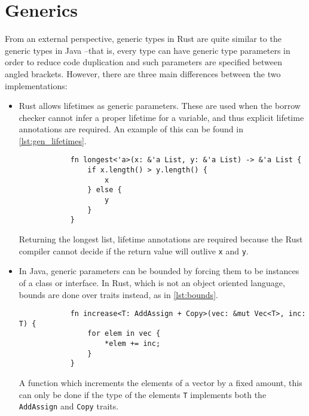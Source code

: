 \section{Generics}

From an external perspective, generic types in Rust are quite similar to the
generic types in Java --that is, every type can have generic type parameters in
order to reduce code duplication and such parameters are specified between
angled brackets. However, there are three main differences between the two
implementations:

\begin{itemize}
    \item Rust allows lifetimes as generic parameters. These are used when the
        borrow checker cannot infer a proper lifetime for a variable, and thus
        explicit lifetime annotations are required. An example of this can be
        found in \ref{lst:gen_lifetimes}.
  
        \begin{listing}[ht]
            \begin{verbatim}
            fn longest<'a>(x: &'a List, y: &'a List) -> &'a List {
                if x.length() > y.length() {
                    x
                } else {
                    y
                }
            }
            \end{verbatim}
            \caption{Returning the longest list, lifetime annotations are required
            because the Rust compiler cannot decide if the return value will outlive
        \texttt{x} and \texttt{y}.}
          \label{lst:gen_lifetimes}
        \end{listing}
    
    \item In Java, generic parameters can be bounded by forcing them to be
        instances of a class or interface. In Rust, which is not an object
        oriented language, bounds are done over traits instead, as in
        \ref{lst:bounds}.
  
        \begin{listing}[ht]
            \begin{verbatim}
            fn increase<T: AddAssign + Copy>(vec: &mut Vec<T>, inc: T) {
                for elem in vec {
                    *elem += inc;
                }
            }
            \end{verbatim}
            \caption{A function which increments the elements of a vector by a fixed
                amount, this can only be done if the type of the elements \texttt{T}
                implements both the \texttt{AddAssign} and \texttt{Copy} traits.}
          \label{lst:bounds}
        \end{listing}


\end{itemize}
